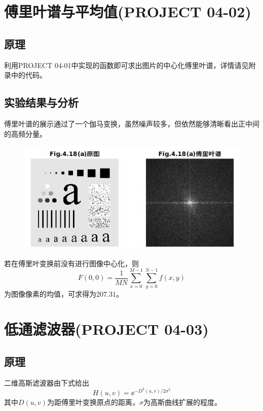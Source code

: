 \documentclass[logo,reportComp]{thesis}
\begin{document}
\section{傅里叶谱与平均值(PROJECT 04-02)}
\subsection{原理}
利用PROJECT 04-01中实现的函数即可求出图片的中心化傅里叶谱，详情请见附录中的代码。

\subsection{实验结果与分析}
傅里叶谱的展示通过了一个伽马变换，虽然噪声较多，但依然能够清晰看出正中间的高频分量。
\begin{figure}[H]
\centering
\includegraphics[width=0.8\linewidth]{fig/01.jpg}
\end{figure}

若在傅里叶变换前没有进行图像中心化，则
\[F(0,0)=\frac{1}{MN}\sum_{x=0}^{M-1}\sum_{y=0}^{N-1}f(x,y)\]
为图像像素的均值，可求得为$207.31$。

\section{低通滤波器(PROJECT 04-03)}
\subsection{原理}
二维高斯滤波器由下式给出
\[H(u,v)=\ee^{-D^2(u,v)/2\sigma^2}\]
其中$D(u,v)$为距傅里叶变换原点的距离，$\sigma$为高斯曲线扩展的程度。
\end{document}
